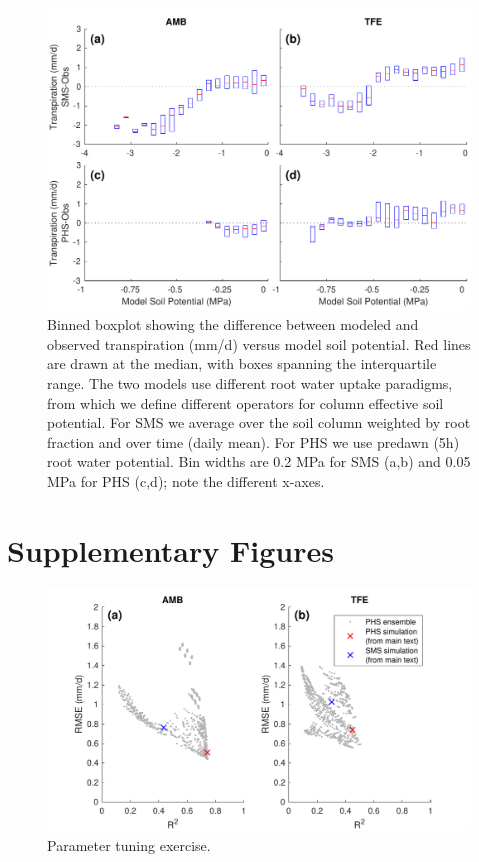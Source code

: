 \documentclass[draft,linenumbers]{agujournal}
\begin{document}
              \begin{figure}[h]
     \centering
     \includegraphics[width=30pc]{../figs3/sm3.pdf}
     \caption{Binned boxplot showing the difference between modeled and observed transpiration (mm/d) versus model soil potential.
     Red lines are drawn at the median, with boxes spanning the interquartile range.
     The two models use different root water uptake paradigms, from which we define different operators for column effective soil potential.
     For SMS we average over the soil column weighted by root fraction and over time (daily mean).
     For PHS we use predawn (5h) root water potential.
     Bin widths are 0.2 MPa for SMS (a,b) and 0.05 MPa for PHS (c,d); note the different x-axes. 
}
     \label{fig:cool}
  \end{figure}
          \clearpage

\clearpage

\appendix

\section{Supplementary Figures}


      \begin{figure}[h]
     \centering
     \includegraphics[width=30pc]{../figs3/ens.pdf}
     \caption{Parameter tuning exercise.
     }
     \label{supp:ens}
       \end{figure}
         \clearpage
\end{document}
